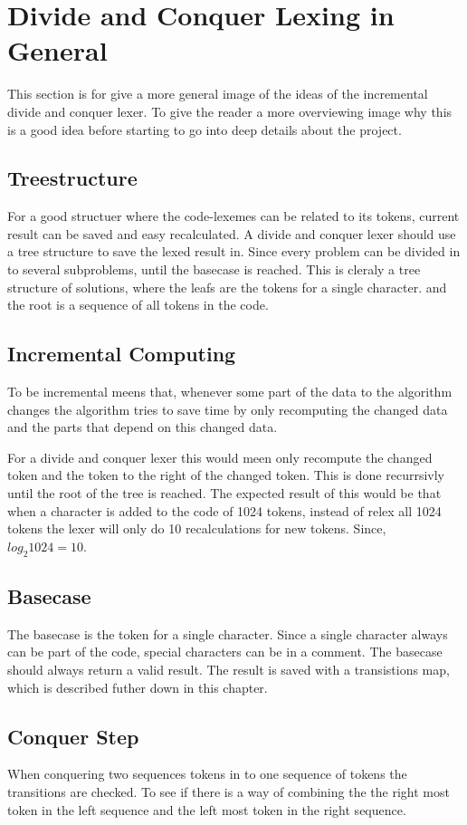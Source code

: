 \section{Divide and Conquer Lexing in General}
This section is for give a more general image of the ideas of the incremental divide and conquer lexer. To give the reader a more overviewing image why this is a good idea before starting to go into deep details about the project.

\subsection{Treestructure}
For a good structuer where the code-lexemes can be related to its tokens, current result can be saved and easy recalculated. A divide and conquer lexer should use a tree structure to save the lexed result in. Since every problem can be divided in to several subproblems, until the basecase is reached. This is cleraly a tree structure of solutions, where the leafs are the tokens for a single character. and the root is a sequence of all tokens in the code.  

\subsection{Incremental Computing}
To be incremental meens that, whenever some part of the data to the algorithm changes the algorithm tries to save time by only recomputing the changed data and the parts that depend on this changed data. \cite{incrementalDef}

For a divide and conquer lexer this would meen only recompute the changed token and the token to the right of the changed token. This is done recurrsivly until the root of the tree is reached. The expected result of this would be that when a character is added to the code of 1024 tokens, instead of relex all 1024 tokens the lexer will only do 10 recalculations for new tokens. Since, $log_2 1024 = 10$. 

\subsection{Basecase}
The basecase is the token for a single character. Since a single character always can be part of the code, special characters can be in a comment.
The basecase should always return a valid result. The result is saved with a transistions map, which is described futher down in this chapter.

\subsection{Conquer Step}
When conquering two sequences tokens in to one sequence of tokens the transitions are checked. To see if there is a way of combining the the right most token in the left sequence and the left most token in the right sequence. 

